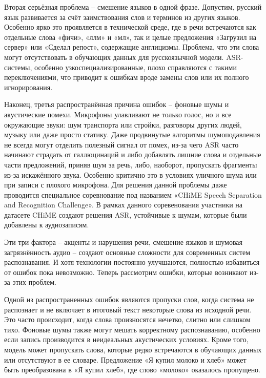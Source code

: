 Вторая серьёзная проблема -- смешение языков в одной фразе.%
Допустим, русский язык развивается за счёт заимствования слов и терминов из других языков.
Особенно ярко это проявляется в технической среде, где в речи встречаются как отдельные слова «фичи», «ллм» и «мл», так и целые предложения «Загрузил на сервер» или «Сделал репост», содержащие англицизмы.
Проблема, что эти слова могут отсутствовать в обучающих данных для русскоязычной модели.
ASR-системы, особенно узкоспециализированные, плохо справляются с такими переключениями, что приводит к ошибкам вроде замены слов или их полного игнорирования.

Наконец, третья распространённая причина ошибок -- фоновые шумы и акустические помехи\cite{hansen1996analysis}.
Микрофоны улавливают не только голос, но и все окружающие звуки: шум транспорта или стройки, разговоры других людей, музыку или даже просто статику.
Даже продвинутые алгоритмы шумоподавления не всегда могут отделить полезный сигнал от помех, из-за чего ASR часто начинают страдать от галлюцинаций и либо добавлять лишние слова и отдельные части предложений, приняв шум за речь, либо, наоборот, пропускать фрагменты из-за искажённого звука.
Особенно критично это в условиях уличного шума или при записи с плохого микрофона.
Для решения данной проблемы даже проводится специальное соревнование под названием «CHiME Speech Separation and Recognition Challenge»\cite{watanabe2020chime}.
В рамках данного соревенования участники на датасете CHiME создают решения ASR, устойчивые к шумам, которые были добавлены к аудиозаписям.

Эти три фактора -- акценты и нарушения речи, смешение языков и шумовая загрязнённость аудио -- создают основные сложности для современных систем распознавания.
И хотя технологии постоянно улучшаются, полностью избавиться от ошибок пока невозможно\cite{dua2023noise, chen2023hyporadise, hu2024large, yang2024large}.
Теперь рассмотрим ошибки, которые возникают из-за этих проблем.

Одной из распространенных ошибок являются пропуски слов, когда система не распознает и не включает в итоговый текст некоторые слова из исходной речи.
Это часто происходит, когда слова произносятся нечетко, слитно или слишком тихо.
Фоновые шумы также могут мешать корректному распознаванию, особенно если запись производится в неидеальных акустических условиях.
Кроме того, модель может пропускать слова, которые редко встречаются в обучающих данных или отсутствуют в ее словаре.
Предложение «Я купил молоко и хлеб» может быть преобразована в «Я купил хлеб», где слово «молоко» оказалось пропущено.

